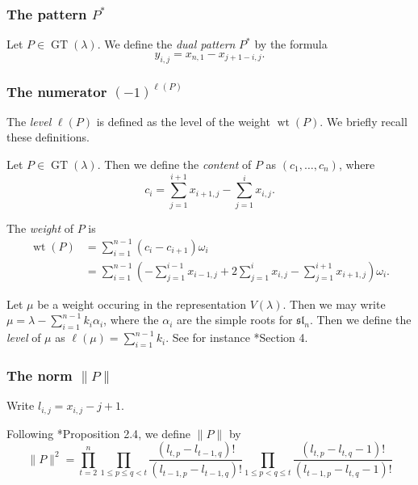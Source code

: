 \documentclass{amsart}[12pt]
\theoremstyle{definition}
\numberwithin{equation}{section}
\newcommand{\GT}{\operatorname{GT}}
\newcommand{\wt}{\operatorname{wt}}
\begin{document}
\subsubsection{The pattern $P^{*}$}
Let $P \in \GT(\lambda)$. We define the \emph{dual pattern} $P^{*}$  by the formula
\[
y_{i,j} = x_{n,1} - x_{j+1-i,j}.
\]



\subsubsection{The numerator $(-1)^{\ell(P)}$}



The \emph{level} $\ell(P)$ is defined as the level of the
weight $\wt(P)$. We briefly recall these definitions.

Let  $P \in \GT(\lambda)$. Then we define the \emph{content} of $P$ as
$(c_1,\ldots,c_n)$, where
\[
c_i = \sum_{j=1}^{i+1}x_{i+1,j} - \sum_{j=1}^{i}x_{i,j}.
\]

The \emph{weight} of $P$ is 
\begin{align*}
  \wt(P) &= \sum_{i=1}^{n-1} (c_i - c_{i+1}) \omega_i \\
  &= \sum_{i=1}^{n-1} \left(-\sum_{j=1}^{i-1} x_{i-1,j} + 2\sum_{j=1}^{i} x_{i,j} - \sum_{j=1}^{i+1} x_{i+1,j}\right) \omega_i.
\end{align*}

Let $\mu$ be a weight occuring in the representation $V(\lambda)$. Then we may write $\mu = \lambda - \sum_{i=1}^{n-1} k_i \alpha_i$, where the $\alpha_i$ are the simple roots for $\mathfrak{sl}_n$. Then we define the \emph{level} of $\mu$ as $\ell(\mu) = \sum_{i=1}^{n-1} k_i$. See for instance \cite{deGraaf2001}*{Section 4}.


\subsubsection{The norm $\| P\|$}

Write $l_{i,j} = x_{i,j} -j+1$.

Following \cite{Molev2006}*{Proposition 2.4}, we define $\| P \|$ by 
\[
\| P \|^2 = \displaystyle \prod_{t=2}^{n} \displaystyle \prod_{1 \leq
  p \leq q < t} \frac{(l_{t,p} - l_{t-1,q})!}{(l_{t-1,p} -
  l_{t-1,q})!} \displaystyle \prod_{1 \leq p < q \leq t} \frac{(l_{t,p} - l_{t,q}-1)!}{(l_{t-1,p} - l_{t,q}-1)!} 
\]
\end{document}
